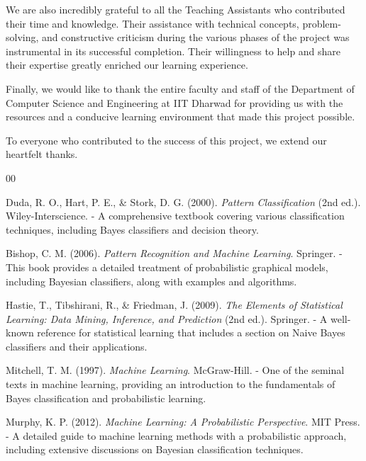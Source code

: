 \documentclass[conference]{IEEEtran}
\begin{document}
	We are also incredibly grateful to all the Teaching Assistants who contributed their time and knowledge. Their assistance with technical concepts, problem-solving, and constructive criticism during the various phases of the project was instrumental in its successful completion. Their willingness to help and share their expertise greatly enriched our learning experience.
	
	Finally, we would like to thank the entire faculty and staff of the Department of Computer Science and Engineering at IIT Dharwad for providing us with the resources and a conducive learning environment that made this project possible.
	
	To everyone who contributed to the success of this project, we extend our heartfelt thanks.
	
	
	\newpage
	\begin{thebibliography}{00}
		
		 Duda, R. O., Hart, P. E., \& Stork, D. G. (2000). \textit{Pattern Classification} (2nd ed.). Wiley-Interscience.
		- A comprehensive textbook covering various classification techniques, including Bayes classifiers and decision theory.
		
		 Bishop, C. M. (2006). \textit{Pattern Recognition and Machine Learning}. Springer.
		- This book provides a detailed treatment of probabilistic graphical models, including Bayesian classifiers, along with examples and algorithms.
		
		 Hastie, T., Tibshirani, R., \& Friedman, J. (2009). \textit{The Elements of Statistical Learning: Data Mining, Inference, and Prediction} (2nd ed.). Springer.
		- A well-known reference for statistical learning that includes a section on Naive Bayes classifiers and their applications.
		
		 Mitchell, T. M. (1997). \textit{Machine Learning}. McGraw-Hill.
		- One of the seminal texts in machine learning, providing an introduction to the fundamentals of Bayes classification and probabilistic learning.
		
		 Murphy, K. P. (2012). \textit{Machine Learning: A Probabilistic Perspective}. MIT Press.
		- A detailed guide to machine learning methods with a probabilistic approach, including extensive discussions on Bayesian classification techniques.
		
	\end{thebibliography}
	
	
\end{document}
